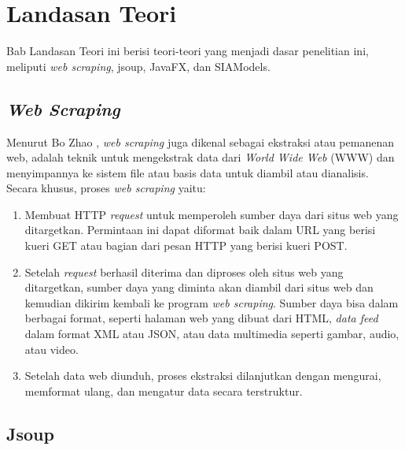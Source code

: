 \chapter{Landasan Teori}
\label{chap:teori}

Bab Landasan Teori ini berisi teori-teori yang menjadi dasar penelitian ini, meliputi \textit{web scraping}, jsoup, JavaFX, dan SIAModels.

\section{\textit{Web Scraping}}
\label{sec:webscraping} 

Menurut Bo Zhao \cite{zhao}, \textit{web scraping} juga dikenal sebagai ekstraksi atau pemanenan web, adalah teknik untuk mengekstrak data dari \textit{World Wide Web} (WWW) dan menyimpannya ke sistem file atau basis data untuk diambil atau dianalisis. Secara khusus, proses \textit{web scraping} yaitu:
\begin{enumerate}
    \item Membuat HTTP \textit{request} untuk memperoleh sumber daya dari situs web yang ditargetkan. Permintaan ini dapat diformat baik dalam URL yang berisi kueri GET atau bagian dari pesan HTTP yang berisi kueri POST.
    \item Setelah \textit{request} berhasil diterima dan diproses oleh situs web yang ditargetkan, sumber daya yang diminta akan diambil dari situs web dan kemudian dikirim kembali ke program \textit{web scraping}. Sumber daya bisa dalam berbagai format, seperti halaman web yang dibuat dari HTML, \textit{data feed} dalam format XML atau JSON, atau data multimedia seperti gambar, audio, atau video. 
    \item Setelah data web diunduh, proses ekstraksi dilanjutkan dengan mengurai, memformat ulang, dan mengatur data secara terstruktur.
\end{enumerate}


\section{Jsoup}
\label{sec:jsoup} 
 
